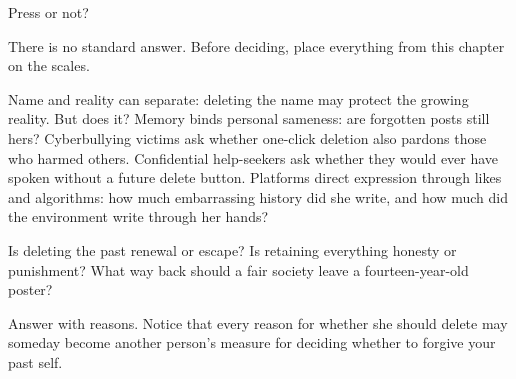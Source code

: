 Press or not?

There is no standard answer. Before deciding, place everything from this chapter on the scales.

Name and reality can separate: deleting the name may protect the growing reality. But does it? Memory binds personal sameness: are forgotten posts still hers? Cyberbullying victims ask whether one-click deletion also pardons those who harmed others. Confidential help-seekers ask whether they would ever have spoken without a future delete button. Platforms direct expression through likes and algorithms: how much embarrassing history did she write, and how much did the environment write through her hands?

Is deleting the past renewal or escape? Is retaining everything honesty or punishment? What way back should a fair society leave a fourteen-year-old poster?

Answer with reasons. Notice that every reason for whether she should delete may someday become another person's measure for deciding whether to forgive your past self.
